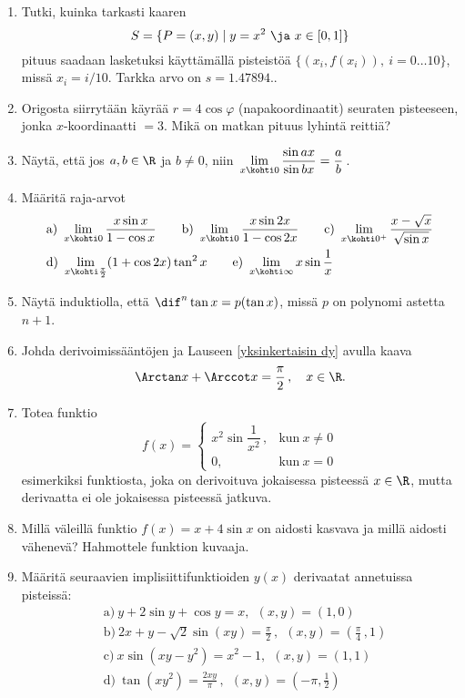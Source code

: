 \Harj
\begin{enumerate}

\item \label{H-V-5: numeerinen kaarenpituus}
Tutki, kuinka tarkasti kaaren
\[
S=\{P=(x,y) \mid y=x^2\ \ja\ x\in[0,1]\}
\]
pituus saadaan lasketuksi käyttämällä pisteistöä $\{(x_i,f(x_i)),\ i=0 \ldots 10\}$, missä 
$x_i=i/10$. Tarkka arvo on $s=1.47894..$

\item
Origosta siirrytään käyrää $r=4\cos\varphi$ (napakoordinaatit) seuraten pisteeseen, jonka
$x$-koordinaatti $=3$. Mikä on matkan pituus lyhintä reittiä?

\item
Näytä, että jos $a,b\in\R$ ja $b \neq 0$, niin 
$\,\displaystyle{\lim_{x \kohti 0}\frac{\sin ax}{\sin bx}=\frac{a}{b}}\,$.

\item
Määritä raja-arvot
\begin{align*}
&\text{a)}\ \lim_{x \kohti 0} \frac{x\sin x}{1-\cos x} \qquad
 \text{b)}\ \lim_{x \kohti 0} \frac{x\sin 2x}{1-\cos 2x} \qquad
 \text{c)}\ \lim_{x \kohti 0^+} \frac{x-\sqrt{x}}{\sqrt{\sin x}} \\
&\text{d)}\ \lim_{x\kohti\frac{\pi}{2}}(1+\cos 2x)\tan^2 x \qquad
 \text{e)}\ \lim_{x\kohti\infty} x\sin\frac{1}{x}
\end{align*}

\item
Näytä induktiolla, että $\dif^n\tan x=p(\tan x)$, missä $p$ on polynomi astetta $n+1$.

\item
Johda derivoimissääntöjen ja Lauseen \ref{yksinkertaisin dy} avulla kaava
\[
\Arctan x + \Arccot x=\frac{\pi}{2}\,, \quad x\in\R.
\]

\item
Totea funktio
\[
f(x)=\begin{cases} 
     x^2\sin\dfrac{1}{x^2}\,, &\text{kun}\ x \neq 0 \\ 0, &\text{kun}\ x=0
     \end{cases} \]
esimerkiksi funktiosta, joka on derivoituva jokaisessa pisteessä $x\in\R$, mutta derivaatta
ei ole jokaisessa pisteessä jatkuva.

\item
Millä väleillä funktio $f(x)=x+4\sin x$ on aidosti kasvava ja millä aidosti vähenevä?
Hahmottele funktion kuvaaja.

\item
Määritä seuraavien implisiittifunktioiden $y(x)$ derivaatat annetuissa pisteissä:
\begin{align*}
&\text{a)}\ y+2\sin y+\cos y=x,\ \ (x,y)=(1,0) \\
&\text{b)}\ 2x+y-\sqrt{2}\sin(xy)=\frac{\pi}{2}\,,\ \ (x,y)=\left(\frac{\pi}{4}\,,1\right) \\
&\text{c)}\ x\sin(xy-y^2)=x^2-1,\ \ (x,y)=(1,1) \\
&\text{d)}\ \tan(xy^2)=\frac{2xy}{\pi}\,,\ \ (x,y)=\left(-\pi,\frac{1}{2}\right)
\end{align*}


\end{enumerate}
